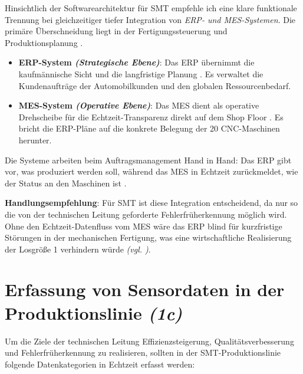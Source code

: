 Hinsichtlich der Softwarearchitektur für \acs{SMT} empfehle ich eine klare funktionale Trennung bei gleichzeitiger tiefer Integration von \textit{\acs{ERP}- und \acs{MES}-Systemen}. Die primäre Überschneidung liegt in der Fertigungssteuerung und Produktionsplanung \cite[28]{2}.

\begin{itemize}[leftmargin=*]
    \item \textbf{\acs{ERP}-System \textit{(Strategische Ebene)}}: Das \acs{ERP} übernimmt die kaufmännische Sicht und die langfristige Planung \cite[10]{1}. Es verwaltet die Kundenaufträge der Automobilkunden und den globalen Ressourcenbedarf.
    
    \item \textbf{\acs{MES}-System \textit{(Operative Ebene)}}: Das \acs{MES} dient als operative Drehscheibe für die Echtzeit-Transparenz direkt auf dem Shop Floor \cite[10]{1}. Es bricht die \acs{ERP}-Pläne auf die konkrete Belegung der 20 \acs{CNC}-Maschinen herunter.
\end{itemize}

Die Systeme arbeiten beim Auftragsmanagement Hand in Hand: Das \acs{ERP} gibt vor, was produziert werden soll, während das \acs{MES} in Echtzeit zurückmeldet, wie der Status an den Maschinen ist \cite[85]{2}.

\textbf{Handlungsempfehlung}: Für \acs{SMT} ist diese Integration entscheidend, da nur so die von der technischen Leitung geforderte Fehlerfrüherkennung möglich wird. Ohne den Echtzeit-Datenfluss vom \acs{MES} wäre das \acs{ERP} \glqq blind\grqq{} für kurzfristige Störungen in der mechanischen Fertigung, was eine wirtschaftliche Realisierung der Losgröße 1 verhindern würde \textit{(\acs{vgl.} \cite[11]{1})}.


\section{Erfassung von Sensordaten in der Produktionslinie \textit{(1c)}}
\label{sec:1c}

Um die Ziele der technischen Leitung Effizienzsteigerung, Qualitätsverbesserung und Fehlerfrüherkennung zu realisieren, sollten in der \acs{SMT}-Produktionslinie folgende Datenkategorien in Echtzeit erfasst werden:

